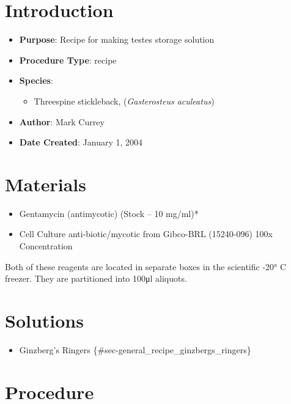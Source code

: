 \documentclass[
  letterpaper,
  DIV=11,
  numbers=noendperiod]{scrreprt}
\providecommand{\tightlist}{%
  \setlength{\itemsep}{0pt}\setlength{\parskip}{0pt}}\usepackage{longtable,booktabs,array}
\begin{document}
\hypertarget{introduction-96}{%
\section{Introduction}\label{introduction-96}}

\begin{itemize}
\tightlist
\item
  \textbf{Purpose}: Recipe for making testes storage solution\\
\item
  \textbf{Procedure Type}: recipe
\item
  \textbf{Species}:

  \begin{itemize}
  \tightlist
  \item
    Threespine stickleback, (\emph{Gasterosteus aculeatus})
  \end{itemize}
\item
  \textbf{Author}: Mark Currey
\item
  \textbf{Date Created}: January 1, 2004
\end{itemize}

\hypertarget{materials-91}{%
\section{Materials}\label{materials-91}}

\begin{itemize}
\tightlist
\item
  Gentamycin (antimycotic) (Stock -- 10 mg/ml)*
\item
  Cell Culture anti-biotic/mycotic from Gibco-BRL (15240-096) 100x
  Concentration
\end{itemize}

Both of these reagents are located in separate boxes in the scientific
-20° C freezer. They are partitioned into 100μl aliquots.

\hypertarget{solutions-82}{%
\section{Solutions}\label{solutions-82}}

\begin{itemize}
\tightlist
\item
  Ginzberg's Ringers \{\#sec-general\_recipe\_ginzbergs\_ringers\}
\end{itemize}

\hypertarget{procedure-91}{%
\section{Procedure}\label{procedure-91}}
\end{document}
